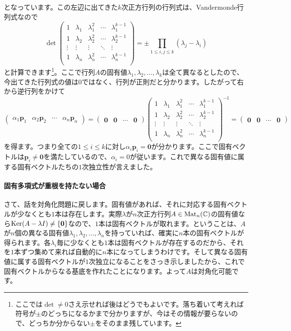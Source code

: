 となっています。この左辺に出てきた$k$次正方行列の行列式は、Vandermonde行列式なので
\[
\det
\begin{pmatrix}
1 & \lambda_1 & \lambda_1^2 & \cdots & \lambda_1^{k - 1} \\
1 & \lambda_2 & \lambda_2^2 & \cdots & \lambda_2^{k - 1} \\
\vdots & \vdots & \vdots & \ddots & \vdots \\
1 & \lambda_n & \lambda_n^2 & \cdots & \lambda_n^{k - 1} \\
\end{pmatrix}
=
\pm \prod_{1 \leq i, j \leq k} (\lambda_j - \lambda_i)
\]
と計算できます\footnote{ここでは$\det \neq 0$さえ示せれば後はどうでもよいです。落ち着いて考えれば符号が$\pm$のどっちになるかまで分かりますが、今はその情報が要らないので、どっちか分からない$\pm$をそのまま残しています。}。ここで行列$A$の固有値$\lambda_1, \lambda_2, \ldots, \lambda_k$は全て異なるとしたので、今出てきた行列式の値は$0$ではなく、行列が正則だと分かります。したがって右から逆行列をかけて
\[
\begin{pmatrix}
\alpha_1 \bm{p}_1 & \alpha_2 \bm{p}_2 & \cdots & \alpha_n \bm{p}_n
\end{pmatrix}
=
\begin{pmatrix}
\bm{0} & \bm{0} & \cdots & \bm{0}
\end{pmatrix}
\begin{pmatrix}
1 & \lambda_1 & \lambda_1^2 & \cdots & \lambda_1^{k - 1} \\
1 & \lambda_2 & \lambda_2^2 & \cdots & \lambda_2^{k - 1} \\
\vdots & \vdots & \vdots & \ddots & \vdots \\
1 & \lambda_n & \lambda_n^2 & \cdots & \lambda_n^{k - 1} \\
\end{pmatrix}^{-1}
=
\begin{pmatrix}
\bm{0} & \bm{0} & \cdots & \bm{0}
\end{pmatrix}
\]
を得ます。つまり全ての$1 \leq i \leq k$に対し$\alpha_i \bm{p}_i = \bm{0}$が分かります。ここで固有ベクトルは$\bm{p}_i \neq \bm{0}$を満たしているので、$\alpha_i = 0$が従います。これで異なる固有値に属する固有ベクトルたちの$1$次独立性が言えました。

\paragraph{固有多項式が重根を持たない場合}

さて、話を対角化問題に戻します。固有値があれば、それに対応する固有ベクトルが少なくとも$1$本は存在します。実際$\lambda$が$n$次正方行列$A \in \operatorname{Mat}_n(\mathbb{C})$の固有値なら$\operatorname{Ker} (A - \lambda I) \neq \{\boldsymbol{0}\}$なので、$1$本は固有ベクトルが取れます。ということは、$A$が$n$個の異なる固有値$\lambda_1, \lambda_2, \ldots, \lambda_n$を持っていれば、確実に$n$本の固有ベクトルが得られます。各$\lambda_i$毎に少なくとも$1$本は固有ベクトルが存在するのだから、それを$1$本ずつ集めて来れば自動的に$n$本になってしまうわけです。そして異なる固有値に属する固有ベクトルが$1$次独立になることをさっき示しましたから、これで固有ベクトルからなる基底を作れたことになります。よって$A$は対角化可能です。

